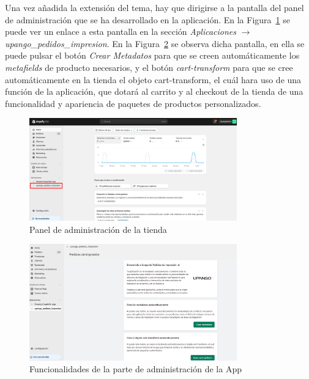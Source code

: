 \documentclass[11pt]{article}
\begin{document}
Una vez añadida la extensión del tema, hay que dirigirse a la pantalla del panel de administración que se ha desarrollado en la aplicación. En la Figura~\ref{fig:PanelAdministracion} se puede
ver un enlace a esta pantalla en la sección \textit{Aplicaciones} $\rightarrow$  \textit{upango\_pedidos\_impresion}. En la Figura~\ref{fig:FuncionalidadAdministracion} se observa dicha pantalla, en ella se puede pulsar el botón \textit{Crear Metadatos} para que se creen 
automáticamente los \textit{metafields} de producto necesarios, y el botón \textit{cart-transform} para que se cree automáticamente en la tienda el objeto cart-transform, el cuál hara uso de una función de la aplicación, que 
dotará al carrito y al checkout de la tienda de una funcionalidad y apariencia de paquetes de productos personalizados.

\begin{figure}[H]
    \centering
    \includegraphics[width=0.8\textwidth]{imagenes/ManualUsuario/PaginaAdministracion.png}
    \caption{\label{fig:PanelAdministracion}Panel de administración de la tienda}
    \vspace{\fill}
\end{figure}

\begin{figure}[H]
    \centering
    \includegraphics[width=0.8\textwidth]{imagenes/ManualUsuario/FuncionalidadPaginaAdministracion.png}
    \caption{\label{fig:FuncionalidadAdministracion}Funcionalidades de la parte de administración de la App}
    \vspace{\fill}
\end{figure}
\end{document}
